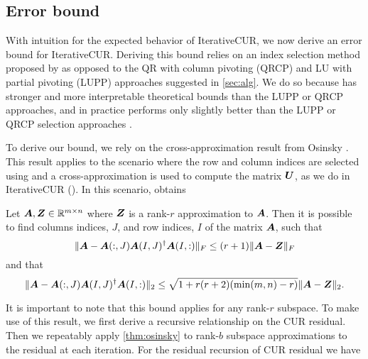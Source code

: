 \subsection{Error bound}\label{subsec:error}
With intuition for the expected behavior of IterativeCUR, we now derive an error bound for IterativeCUR. Deriving this bound relies on an index selection method proposed by \cite{osinsky2025close} as opposed to the QR with column pivoting (QRCP) and LU with partial pivoting (LUPP) approaches suggested in \cref{sec:alg}. We do so because \cite{osinsky2025close} has stronger and more interpretable theoretical bounds than the LUPP or QRCP approaches, and in practice performs only slightly better than the LUPP or QRCP selection approaches \cite{cortinovis2024adaptive}. %


To derive our bound, we rely on the cross-approximation result from Osinsky \cite{osinsky2025close}. This result applies to the scenario where the row and column indices are selected using \cite[Algorithm 1]{osinsky2025close} and a cross-approximation is used to compute the matrix $\boldsymbol{U}$, as we do in IterativeCUR (\icur). In this scenario, \cite{osinsky2025close} obtains
\begin{theorem} \label{thm:osinsky}
    Let $\boldsymbol{A},\boldsymbol{Z}\in \mathbb{R}^{m \times n}$ where $\boldsymbol{Z}$ is a rank-$r$ approximation to $\boldsymbol{A}$. Then it is possible to find columns indices, $J$, and row indices, $I$ of the matrix $\boldsymbol{A}$, such that 
    \begin{equation}
        \|\boldsymbol{A} - \boldsymbol{A}(:,J) \boldsymbol{A}(I,J)^\dagger \boldsymbol{A}(I,:)\|_F \leq (r+1) \|\boldsymbol{A} - \boldsymbol{Z}\|_F
    \end{equation}
    and that 
    \begin{equation}
        \|\boldsymbol{A} - \boldsymbol{A}(:,J) \boldsymbol{A}(I,J)^\dagger \boldsymbol{A}(I,:)\|_2 \leq \sqrt{1 + r(r+2)(\min(m,n) - r)} \|\boldsymbol{A} - \boldsymbol{Z}\|_2.
    \end{equation}
\end{theorem}

It is important to note that this bound applies for any rank-$r$ subspace. To make use of this result, we first derive a recursive relationship on the CUR residual. Then we repeatably apply \cref{thm:osinsky} to rank-$b$ subspace approximations to the residual at each iteration. For the residual recursion of CUR residual we have

